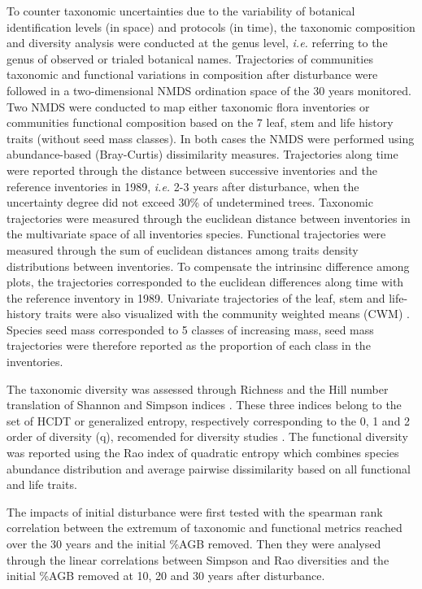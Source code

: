 \documentclass[fleqn,10pt]{ArtEcoFoG} %
\theoremstyle{definition}
\theoremstyle{definition}
\theoremstyle{definition}
\theoremstyle{remark}
\begin{document}
To counter taxonomic uncertainties due to the variability of botanical
identification levels (in space) and protocols (in time), the taxonomic
composition and diversity analysis were conducted at the genus level,
\emph{i.e.} referring to the genus of observed or trialed botanical
names. Trajectories of communities taxonomic and functional variations
in composition after disturbance were followed in a two-dimensional NMDS
ordination space of the 30 years monitored. Two NMDS were conducted to
map either taxonomic flora inventories or communities functional
composition based on the 7 leaf, stem and life history traits (without
seed mass classes). In both cases the NMDS were performed using
abundance-based (Bray-Curtis) dissimilarity measures. Trajectories along
time were reported through the distance between successive inventories
and the reference inventories in 1989, \emph{i.e.} 2-3 years after
disturbance, when the uncertainty degree did not exceed 30\% of
undetermined trees. Taxonomic trajectories were measured through the
euclidean distance between inventories in the multivariate space of all
inventories species. Functional trajectories were measured through the
sum of euclidean distances among traits density distributions between
inventories. To compensate the intrinsinc difference among plots, the
trajectories corresponded to the euclidean differences along time with
the reference inventory in 1989. Univariate trajectories of the leaf,
stem and life-history traits were also visualized with the community
weighted means (CWM) \citep{Diaz2007, Garnier2004}. Species seed mass
corresponded to 5 classes of increasing mass, seed mass trajectories
were therefore reported as the proportion of each class in the
inventories.

The taxonomic diversity was assessed through Richness and the Hill
number translation of Shannon and Simpson indices \citep{Hill1973}.
These three indices belong to the set of HCDT or generalized entropy,
respectively corresponding to the 0, 1 and 2 order of diversity (q),
recomended for diversity studies
\citep{Patil1982, Tothmeresz1995, Marcon2015}. The functional diversity
was reported using the Rao index of quadratic entropy which combines
species abundance distribution and average pairwise dissimilarity based
on all functional and life traits.

The impacts of initial disturbance were first tested with the spearman
rank correlation between the extremum of taxonomic and functional
metrics reached over the 30 years and the initial \%AGB removed. Then
they were analysed through the linear correlations between Simpson and
Rao diversities and the initial \%AGB removed at 10, 20 and 30 years
after disturbance.
\end{document}
